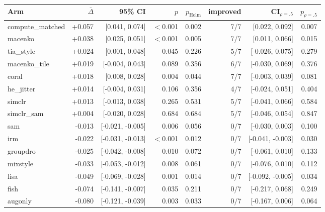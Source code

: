 \begin{tabular}{lrrrrrrr}
\toprule
Arm & $\bar\Delta$ & 95\% CI & $p$ & $p_\text{Holm}$ & improved & CI$_{\rho=.5}$ & $p_{\rho=.5}$ \\
\midrule
compute\_matched & +0.057 & [0.041, 0.074] & $<$0.001 & 0.002 & 7/7 & [0.022, 0.092] & 0.007 \\
macenko & +0.038 & [0.025, 0.051] & $<$0.001 & 0.005 & 7/7 & [0.011, 0.066] & 0.015 \\
tia\_style & +0.024 & [0.001, 0.048] & 0.045 & 0.226 & 5/7 & [-0.026, 0.075] & 0.279 \\
macenko\_tile & +0.019 & [-0.004, 0.043] & 0.089 & 0.356 & 6/7 & [-0.030, 0.069] & 0.376 \\
coral & +0.018 & [0.008, 0.028] & 0.004 & 0.044 & 7/7 & [-0.003, 0.039] & 0.081 \\
he\_jitter & +0.014 & [-0.004, 0.031] & 0.106 & 0.356 & 4/7 & [-0.024, 0.051] & 0.404 \\
simclr & +0.013 & [-0.013, 0.038] & 0.265 & 0.531 & 5/7 & [-0.041, 0.066] & 0.584 \\
simclr\_sam & +0.004 & [-0.020, 0.028] & 0.684 & 0.684 & 5/7 & [-0.046, 0.054] & 0.847 \\
sam & -0.013 & [-0.021, -0.005] & 0.006 & 0.056 & 0/7 & [-0.030, 0.003] & 0.100 \\
irm & -0.022 & [-0.031, -0.013] & $<$0.001 & 0.012 & 0/7 & [-0.041, -0.003] & 0.030 \\
groupdro & -0.025 & [-0.042, -0.008] & 0.010 & 0.072 & 0/7 & [-0.061, 0.010] & 0.133 \\
mixstyle & -0.033 & [-0.053, -0.012] & 0.008 & 0.061 & 0/7 & [-0.076, 0.010] & 0.112 \\
lisa & -0.049 & [-0.069, -0.028] & 0.001 & 0.014 & 0/7 & [-0.092, -0.005] & 0.034 \\
fish & -0.074 & [-0.141, -0.007] & 0.035 & 0.211 & 0/7 & [-0.217, 0.068] & 0.249 \\
augonly & -0.080 & [-0.121, -0.039] & 0.003 & 0.033 & 0/7 & [-0.167, 0.006] & 0.064 \\
\bottomrule
\end{tabular}
